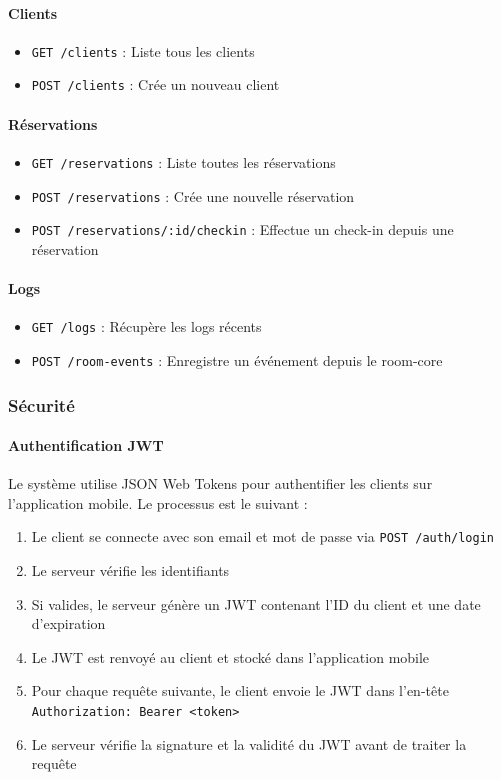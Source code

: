 \documentclass[11pt,a4paper]{article}
\begin{document}
\paragraph{Clients}
\begin{itemize}
    \item \texttt{GET /clients} : Liste tous les clients
    \item \texttt{POST /clients} : Crée un nouveau client
\end{itemize}

\paragraph{Réservations}
\begin{itemize}
    \item \texttt{GET /reservations} : Liste toutes les réservations
    \item \texttt{POST /reservations} : Crée une nouvelle réservation
    \item \texttt{POST /reservations/:id/checkin} : Effectue un check-in depuis une réservation
\end{itemize}

\paragraph{Logs}
\begin{itemize}
    \item \texttt{GET /logs} : Récupère les logs récents
    \item \texttt{POST /room-events} : Enregistre un événement depuis le room-core
\end{itemize}

\subsubsection{Sécurité}

\paragraph{Authentification JWT}
Le système utilise JSON Web Tokens pour authentifier les clients sur l'application mobile. Le processus est le suivant :

\begin{enumerate}
    \item Le client se connecte avec son email et mot de passe via \texttt{POST /auth/login}
    \item Le serveur vérifie les identifiants
    \item Si valides, le serveur génère un JWT contenant l'ID du client et une date d'expiration
    \item Le JWT est renvoyé au client et stocké dans l'application mobile
    \item Pour chaque requête suivante, le client envoie le JWT dans l'en-tête \texttt{Authorization: Bearer <token>}
    \item Le serveur vérifie la signature et la validité du JWT avant de traiter la requête
\end{enumerate}
\end{document}
